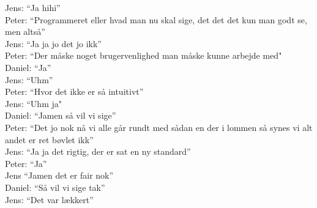 Jens: “Ja hihi”\\
Peter: “Programmeret eller hvad man nu skal sige, det det det kun man godt se, men altså”\\
Jens: “Ja ja jo det jo ikk”\\
Peter: “Der måske noget brugervenlighed man måske kunne arbejde med"\\
Daniel: “Ja”\\
Jens: “Uhm”\\
Peter: “Hvor det ikke er så intuitivt”\\
Jens: “Uhm ja"\\
Daniel: “Jamen så vil vi sige”\\
Peter: “Det jo nok nå vi alle går rundt med sådan en der i lommen så synes vi alt andet er ret bøvlet ikk”\\
Jens: “Ja ja det rigtig, der er sat en ny standard”\\
Peter: “Ja”\\
Jens “Jamen det er fair nok”\\
Daniel: “Så vil vi sige tak”\\
Jens: “Det var lækkert”\\